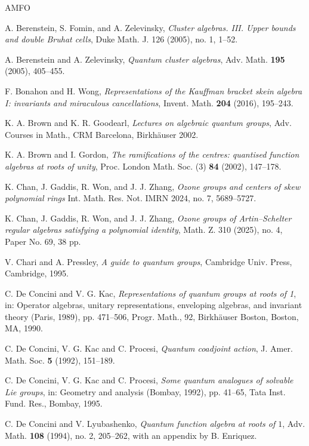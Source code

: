 \documentclass[11pt]{amsart}
\theoremstyle{plain}
\begin{document}
\begin{thebibliography}{AMFO}

 A. Berenstein, S. Fomin, and A. Zelevinsky, {\em{Cluster algebras. III. Upper bounds and double Bruhat cells}}, 
Duke Math. J. 126 (2005), no. 1, 1–52.

 A. Berenstein and A. Zelevinsky, {\em{Quantum cluster algebras}}, Adv. Math. {\bf{195}} (2005), 405--455.

 F. Bonahon and H. Wong, {\em{Representations of the Kauffman bracket skein algebra I: invariants and miraculous cancellations}},
Invent. Math. {\bf{204}} (2016), 195--243.

 K. A. Brown and K. R. Goodearl, {\em{Lectures on algebraic quantum groups}},  Adv. Courses in Math., CRM Barcelona, Birkh\"auser 2002.

 K. A. Brown and I. Gordon, {\em{The ramifications of the centres: quantised function algebras at roots of unity}}, Proc. London Math. Soc. (3) {\bf{84}} (2002), 
147--178. 

 K. Chan, J. Gaddis, R. Won, and J. J. Zhang, {\em{Ozone groups and centers of skew polynomial rings}} Int. Math. Res. Not. IMRN 2024, no. 7, 5689--5727.

 K. Chan, J. Gaddis, R. Won, and J. J. Zhang, {\em{Ozone groups of Artin--Schelter regular algebras satisfying a polynomial identity}}, 
Math. Z. 310 (2025), no. 4, Paper No. 69, 38 pp.

 V. Chari and A. Pressley, {\em{A guide to quantum groups}}, Cambridge Univ. Press, Cambridge, 1995. 

   C. De Concini and V. G. Kac, {\em{Representations of quantum groups at roots of 1}}, 
    in: Operator algebras, unitary representations, enveloping algebras, and invariant theory (Paris, 1989), 
    pp. 471--506, Progr. Math., 92, Birkh\"auser Boston, Boston, MA, 1990.
    
 C. De Concini, V. G. Kac and C. Procesi, {\em{Quantum coadjoint action}}, 
J. Amer. Math. Soc. {\bf{5}} (1992), 151--189.

 C. De Concini, V. G. Kac and C. Procesi, {\em{Some quantum analogues of solvable Lie groups}}, in: Geometry and analysis (Bombay, 1992), pp. 41--65, Tata Inst. Fund. Res., Bombay, 1995.

 C. De Concini and V. Lyubashenko, {\em{Quantum function algebra at roots of $1$}}, 
Adv. Math. {\bf{108}} (1994), no. 2, 205–262, with an appendix by B. Enriquez.


\end{thebibliography}
\end{document}
